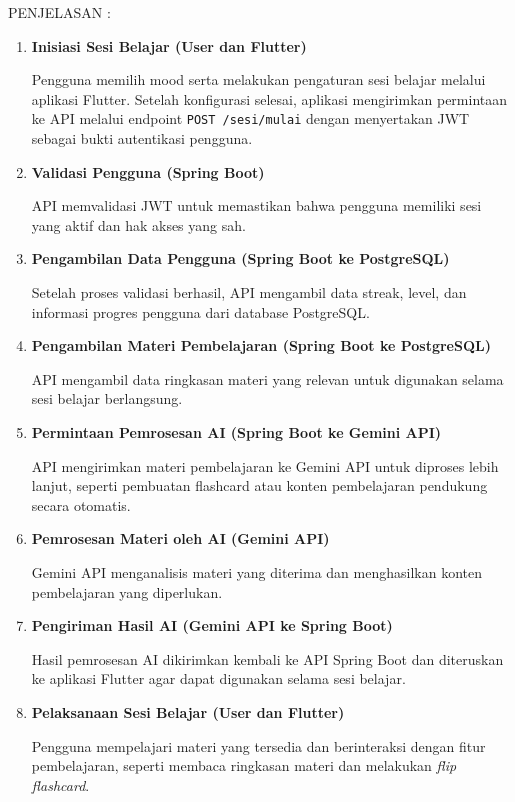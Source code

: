 \documentclass[11pt]{article}
\begin{document}
PENJELASAN :

\begin{enumerate}

\item \textbf{Inisiasi Sesi Belajar (User dan Flutter)}

Pengguna memilih mood serta melakukan pengaturan sesi belajar melalui aplikasi Flutter. Setelah konfigurasi selesai, aplikasi mengirimkan permintaan ke API melalui endpoint \texttt{POST /sesi/mulai} dengan menyertakan JWT sebagai bukti autentikasi pengguna.

\item \textbf{Validasi Pengguna (Spring Boot)}

API memvalidasi JWT untuk memastikan bahwa pengguna memiliki sesi yang aktif dan hak akses yang sah.

\item \textbf{Pengambilan Data Pengguna (Spring Boot ke PostgreSQL)}

Setelah proses validasi berhasil, API mengambil data streak, level, dan informasi progres pengguna dari database PostgreSQL.

\item \textbf{Pengambilan Materi Pembelajaran (Spring Boot ke PostgreSQL)}

API mengambil data ringkasan materi yang relevan untuk digunakan selama sesi belajar berlangsung.

\item \textbf{Permintaan Pemrosesan AI (Spring Boot ke Gemini API)}

API mengirimkan materi pembelajaran ke Gemini API untuk diproses lebih lanjut, seperti pembuatan flashcard atau konten pembelajaran pendukung secara otomatis.

\item \textbf{Pemrosesan Materi oleh AI (Gemini API)}

Gemini API menganalisis materi yang diterima dan menghasilkan konten pembelajaran yang diperlukan.

\item \textbf{Pengiriman Hasil AI (Gemini API ke Spring Boot)}

Hasil pemrosesan AI dikirimkan kembali ke API Spring Boot dan diteruskan ke aplikasi Flutter agar dapat digunakan selama sesi belajar.

\item \textbf{Pelaksanaan Sesi Belajar (User dan Flutter)}

Pengguna mempelajari materi yang tersedia dan berinteraksi dengan fitur pembelajaran, seperti membaca ringkasan materi dan melakukan \textit{flip flashcard}.


\end{enumerate}
\end{document}
